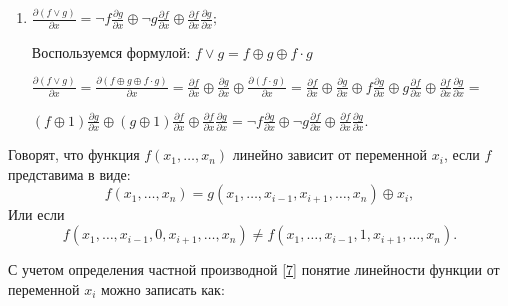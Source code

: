 \begin{enumerate}[label=\arabic*)]
    $\frac{\partial\left(f \cdot g\right)}{\partial x_i} = f(x)\cdot g(x) \oplus f(x^{(i)}) \cdot g(x^{(i)}) = f(x)\cdot g(x) \oplus \left(\frac{\partial f}{\partial x_i} \oplus f(x)\right) \cdot$
    
    $\left(\frac{\partial g}{\partial x_i} \oplus g(x)\right) = f(x)\cdot g(x) \oplus \big(\frac{\partial f}{\partial x_i}\frac{\partial g}{\partial x_i} \oplus \frac{\partial f}{\partial x_i}g \oplus f\frac{\partial g}{\partial x_i} \oplus f(x)\cdot g(x)\big) =$
    
    $ f\frac{\partial g}{\partial x} \oplus g\frac{\partial f}{\partial x} \oplus \frac{\partial f}{\partial x}\frac{\partial g}{\partial x};$

    
    \item $\frac{\partial\left(f \vee g\right)}{\partial x} = \neg f\frac{\partial g}{\partial x} \oplus \neg g\frac{\partial f}{\partial x} \oplus \frac{\partial f}{\partial x}\frac{\partial g}{\partial x};$
    
    Воспользуемся формулой: $f \vee g = f \oplus g \oplus f \cdot g$
    
    $\frac{\partial\left(f \vee g\right)}{\partial x} = \frac{\partial\left(f \oplus g \oplus f \cdot g\right)}{\partial x} = \frac{\partial f}{\partial x} \oplus \frac{\partial g}{\partial x} \oplus \frac{\partial\left(f \cdot g\right)}{\partial x} = \frac{\partial f}{\partial x} \oplus \frac{\partial g}{\partial x} \oplus f\frac{\partial g}{\partial x} \oplus g\frac{\partial f}{\partial x} \oplus \frac{\partial f}{\partial x}\frac{\partial g}{\partial x} = $

    $(f \oplus 1) \frac{\partial g}{\partial x} \oplus (g \oplus 1)\frac{\partial f}{\partial x} \oplus \frac{\partial f}{\partial x}\frac{\partial g}{\partial x} = \neg f\frac{\partial g}{\partial x} \oplus \neg g\frac{\partial f}{\partial x} \oplus \frac{\partial f}{\partial x}\frac{\partial g}{\partial x}.$
    
\end{enumerate}
\begin{definition}
    Говорят, что функция $f(x_1,\dots,x_n)$ линейно зависит от переменной $x_i$, если $f$ представима в виде:
    \[
    f(x_1,\dots,x_n) = g(x_1, \dots, x_{i-1},x_{i+1},\dots, x_n) \oplus x_i,
    \]
    Или если 
    \[
    f(x_1, \dots, x_{i-1},0,x_{i+1},\dots, x_n) \neq f(x_1, \dots, x_{i-1},1,x_{i+1},\dots, x_n).
    \]
\end{definition}
С учетом определения частной производной \eqref{7} понятие линейности функции от переменной $x_i$ можно записать как:
